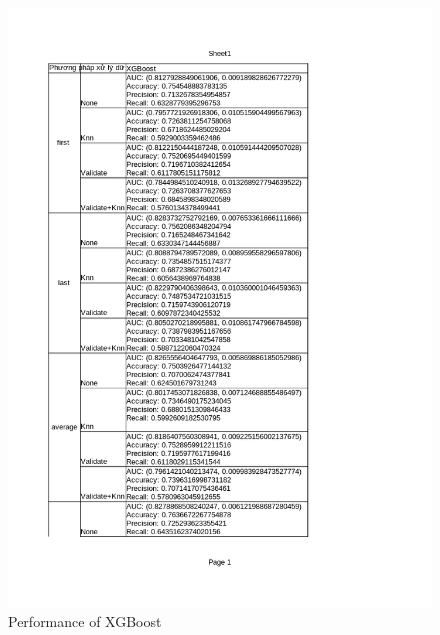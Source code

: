 \documentclass[../main.tex]{subfiles}
\begin{document}
 \begin{figure}[H]
    \centering
    \includegraphics[width=\textwidth]{Figure/KidneyResultLimit-new_XGBoost.png}
    \caption{Performance of XGBoost}
    \label{fig:KidneyResultLimit-new_XGBoost}
\end{figure}
\end{document}
